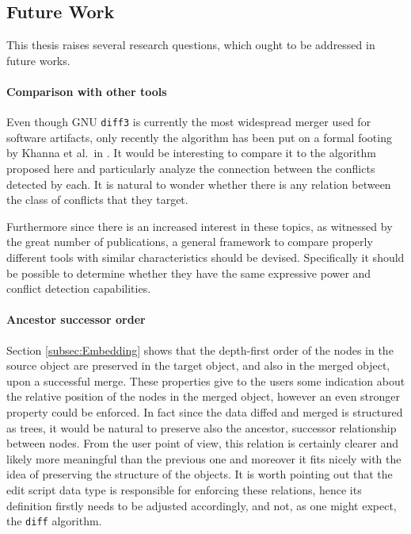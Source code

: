 \documentclass[../Thesis.tex]{subfiles}
\begin{document}
	
	\subsection{Future Work}	
	This thesis raises several research questions, which ought to be 
	addressed in future works.
	
	\paragraph{Comparison with other tools}
	Even though GNU \texttt{diff3} is currently the most widespread merger 
	used for software artifacts, only recently the algorithm has been put on a 
	formal footing by Khanna et al.\ in \cite{PierceDiff3}.
	It would be interesting to compare it to the algorithm proposed here
	and particularly analyze the connection between the conflicts detected
	by each. It is natural to wonder whether there is any relation between
	the class of conflicts that they target. 
	
	Furthermore since there is an increased interest in these topics, as 
	witnessed by the great number of publications, a general framework
	to compare properly different tools with similar characteristics 
	should be devised. Specifically it should be possible 
	to determine whether they have the same expressive power and
	conflict detection capabilities.
	
	\paragraph{Ancestor successor order}		
	Section \ref{subsec:Embedding} shows that the depth-first order
	of the nodes in the source object are preserved in the target object,
	and also in the merged object, upon a successful merge.
	These properties give to the users some indication about the relative
	position of the nodes in the merged object, however an even stronger
	property could be enforced. In fact since the data diffed and merged is 
	structured as trees, it would be natural to preserve also the ancestor, 
	successor relationship between nodes.
	From the user point of view, this relation is certainly clearer and likely 
	more meaningful than the previous one and moreover it fits nicely
	with the idea of preserving the structure of the objects.
	It is worth pointing out that the edit script data type is responsible
	for enforcing these relations, hence its definition firstly needs to be 
	adjusted accordingly, and not, as one might expect, the \texttt{diff}
	algorithm.
	
\end{document}
